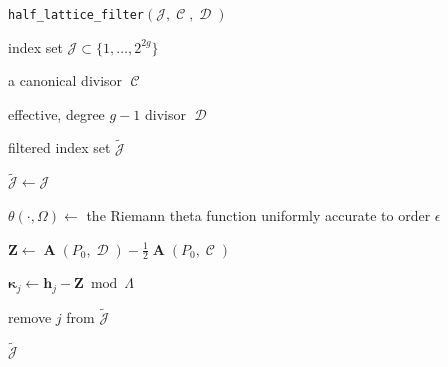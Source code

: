 \documentclass[12pt]{article}
\theoremstyle{definition}
\DeclareMathOperator{\DivC}{\mathcal{C}}
\DeclareMathOperator{\DivD}{\mathcal{D}}
\DeclareMathOperator{\Abel}{\boldsymbol{A}}
\begin{document}
\begin{algorithm}[t]
\caption{{\tt half\_lattice\_filter}$(\mathcal{J},\DivC,\DivD)$}
\label{alg:half-lattice-filter}
\begin{algorithmic}[1]

  \Require index set $\mathcal{J} \subset \{1, \ldots, 2^{2g}\}$

  \Require a canonical divisor $\DivC$

  \Require effective, degree $g-1$ divisor $\DivD$

  \Ensure filtered index set $\tilde{\mathcal{J}}$

  \State $\tilde{\mathcal{J}} \gets \mathcal{J}$

  \State $\theta( \cdot, \Omega) \gets$ the Riemann theta function
  uniformly accurate to order $\epsilon$

  \State $\boldsymbol{Z} \gets \Abel(P_0,\DivD) - \tfrac{1}{2}
  \Abel(P_0,\DivC)$


      \State $\boldsymbol{\kappa}_j \gets \boldsymbol{h}_j - \boldsymbol{Z}
      \bmod{\Lambda}$


          \State remove $j$ from $\tilde{\mathcal{J}}$

      \EndIf

  \EndFor

  \State \Return $\tilde{\mathcal{J}}$

\end{algorithmic}
\end{algorithm}
\end{document}
